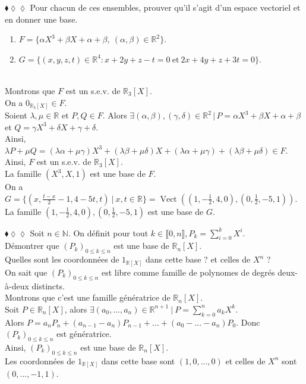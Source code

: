 \documentclass[11pt]{article}
\newcommand*{\R}{\mathbb{R}}
\newcommand*{\N}{\mathbb{N}}
\DeclareMathOperator*{\vect}{Vect}
\begin{document}
\begin{exercise}{$\blacklozenge\lozenge\lozenge$}{}
    Pour chacun de ces ensembles, prouver qu'il s'agit d'un espace vectoriel et en donner une base.
    \begin{enumerate}[topsep=0pt,itemsep=-0.9ex]
        \item $F = \{\alpha X^3 + \beta X + \alpha + \beta, ~ (\alpha, \beta) \in \R^2\}$.
        \item $G = \{(x,y,z,t) \in \R^4 : x + 2y + z - t = 0 ~ \text{et} ~ 2x + 4y + z + 3t = 0\}$.
    \end{enumerate}
    \tcblower\\[0.2cm]
     Montrons que $F$ est un s.e.v. de $\R_3[X]$.\\
    On a $0_{\R_3[X]} \in F$.\\
    Soient $\lambda, \mu \in \R$ et $P, Q \in F$.
    Alors $\exists (\alpha, \beta), (\gamma, \delta) \in \R^2 \, | \,  P = \alpha X^3 + \beta X + \alpha + \beta$ et $Q = \gamma X^3 + \delta X + \gamma + \delta$.\\
    Ainsi, $\lambda P + \mu Q = (\lambda\alpha + \mu\gamma)X^3 + (\lambda\beta + \mu\delta)X + (\lambda\alpha + \mu\gamma) + (\lambda\beta + \mu\delta) \in F$.\\
    Ainsi, $F$ est un s.e.v. de $\R_3[X]$.\\
    La famille $(X^3, X, 1)$ est une base de $F$.\\[0.3cm]
     On a $G = \{(x, \frac{t-x}{2} - 1, 4 - 5t, t) ~ | ~ x,t\in\R\} = \vect((1, -\frac{1}{2}, 4, 0), (0, \frac{1}{2}, -5, 1))$.\\
    La famille $(1, -\frac{1}{2}, 4, 0), (0, \frac{1}{2}, -5, 1)$ est une base de $G$.
\end{exercise}

\begin{exercise}{$\blacklozenge\lozenge\lozenge$}{}
    Soit $n \in \N$. On définit pour tout $k\in\llbracket 0, n \rrbracket, P_k = \sum\limits_{i=0}^k X^i$.\\
    Démontrer que $(P_k)_{0\leq k\leq n}$ est une base de $\R_n[X]$.\\
    Quelles sont les coordonnées de $1_{\R[X]}$ dans cette base ? et celles de $X^n$ ?
    \tcblower\\[0.2cm]
    On sait que $(P_k)_{0\leq k\leq n}$ est libre comme famille de polynomes de degrés deux-à-deux distincts.\\
    Montrons que c'est une famille génératrice de $\R_n[X]$.\\
    Soit $P\in\R_n[X]$, alors $\exists (a_0, ..., a_n) \in \R^{n+1} ~ | ~ P = \sum_{k=0}^n a_kX^k$.\\
    Alors $P = a_n P_n + (a_{n-1} - a_n) P_{n-1} + ... + (a_0 - ... - a_n) P_0$. Donc $(P_k)_{0\leq k\leq n}$ est génératrice.\\
    Ainsi, $(P_k)_{0\leq k\leq n}$ est une base de $\R_n[X]$.\\
    Les coordonnées de $1_{\R[X]}$ dans cette base sont $(1, 0, ..., 0)$ et celles de $X^n$ sont $(0, ..., -1, 1)$.
\end{exercise}
\end{document}
